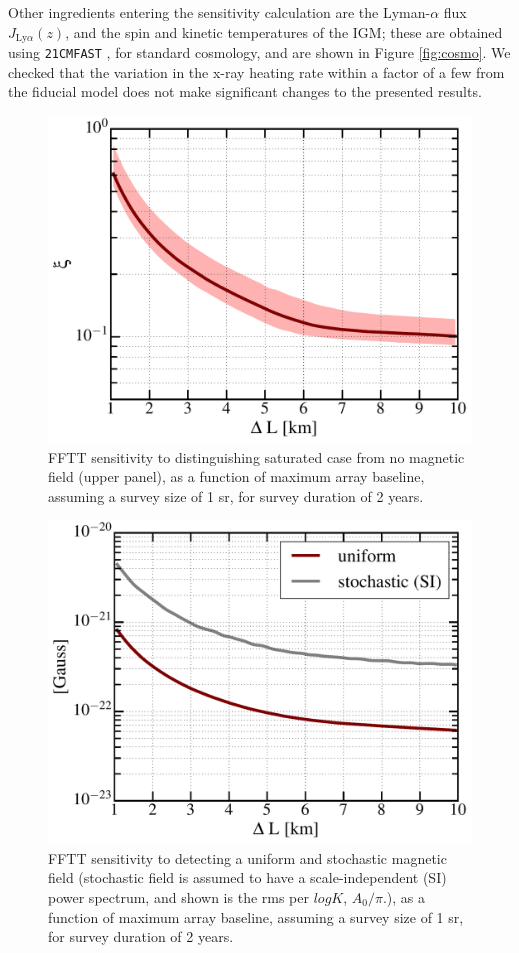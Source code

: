 Other ingredients entering the sensitivity calculation are the Lyman-$\alpha$ flux $J_{\text{Ly}\alpha}(z)$, and the spin and kinetic temperatures of the IGM; these are obtained using \texttt{21CMFAST} \cite{2011MNRAS.411..955M}, for standard cosmology, and are shown in Figure \ref{fig:cosmo}. We checked that the variation in the x-ray heating rate within a factor of a few from the fiducial model does not make significant changes to the presented results.
\begin{figure}
\centering
\includegraphics[width=.35\textwidth,keepaspectratio=true]{xi_vs_deltas.pdf}
\caption{FFTT sensitivity to distinguishing saturated case from no magnetic field (upper panel), as a function of maximum array baseline, assuming a survey size of 1 sr, for survey duration of 2 years.\label{fig:xi_vs_deltas}}
\end{figure}
\begin{figure}
\centering
\includegraphics[width=.35\textwidth,keepaspectratio=true]{B_vs_deltas.pdf}
\caption{FFTT sensitivity to detecting a uniform and stochastic magnetic field (stochastic field is assumed to have a scale-independent (SI) power spectrum, and shown is the rms per $log K$, $A_0/\pi$.), as a function of maximum array baseline, assuming a survey size of 1 sr, for survey duration of 2 years.\label{fig:B_vs_deltas}}
\end{figure}
